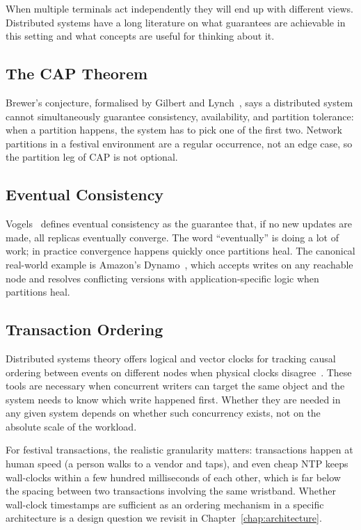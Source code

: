 When multiple terminals act independently they will end up with different views. Distributed systems have a long literature on what guarantees are achievable in this setting and what concepts are useful for thinking about it.

\subsection{The CAP Theorem}
\label{subsec:cap-theorem}

Brewer's conjecture, formalised by Gilbert and Lynch~\cite{Gilbert2002}, says a distributed system cannot simultaneously guarantee consistency, availability, and partition tolerance: when a partition happens, the system has to pick one of the first two. Network partitions in a festival environment are a regular occurrence, not an edge case, so the partition leg of CAP is not optional.

\subsection{Eventual Consistency}
\label{subsec:eventual-consistency}

Vogels~\cite{Vogels2009} defines eventual consistency as the guarantee that, if no new updates are made, all replicas eventually converge. The word ``eventually'' is doing a lot of work; in practice convergence happens quickly once partitions heal. The canonical real-world example is Amazon's Dynamo~\cite{DeCandia2007}, which accepts writes on any reachable node and resolves conflicting versions with application-specific logic when partitions heal.

\subsection{Transaction Ordering}
\label{subsec:transaction-ordering}

Distributed systems theory offers logical and vector clocks for tracking causal ordering between events on different nodes when physical clocks disagree~\cite{DeCandia2007}. These tools are necessary when concurrent writers can target the same object and the system needs to know which write happened first. Whether they are needed in any given system depends on whether such concurrency exists, not on the absolute scale of the workload.

For festival transactions, the realistic granularity matters: transactions happen at human speed (a person walks to a vendor and taps), and even cheap NTP keeps wall-clocks within a few hundred milliseconds of each other, which is far below the spacing between two transactions involving the same wristband. Whether wall-clock timestamps are sufficient as an ordering mechanism in a specific architecture is a design question we revisit in Chapter~\ref{chap:architecture}.
